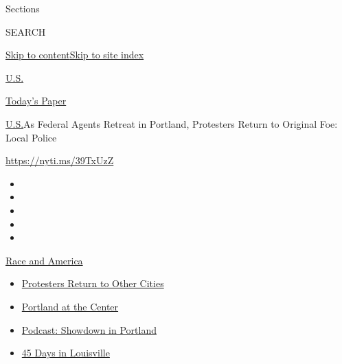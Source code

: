 Sections

SEARCH

\protect\hyperlink{site-content}{Skip to
content}\protect\hyperlink{site-index}{Skip to site index}

\href{https://www.nytimes.com/section/us}{U.S.}

\href{https://myaccount.nytimes.com/auth/login?response_type=cookie\&client_id=vi}{}

\href{https://www.nytimes.com/section/todayspaper}{Today's Paper}

\href{/section/us}{U.S.}\textbar{}As Federal Agents Retreat in Portland,
Protesters Return to Original Foe: Local Police

\url{https://nyti.ms/39TxUzZ}

\begin{itemize}
\item
\item
\item
\item
\item
\end{itemize}

\href{https://www.nytimes.com/news-event/george-floyd-protests-minneapolis-new-york-los-angeles?action=click\&pgtype=Article\&state=default\&region=TOP_BANNER\&context=storylines_menu}{Race
and America}

\begin{itemize}
\tightlist
\item
  \href{https://www.nytimes.com/2020/07/26/us/protests-portland-seattle-trump.html?action=click\&pgtype=Article\&state=default\&region=TOP_BANNER\&context=storylines_menu}{Protesters
  Return to Other Cities}
\item
  \href{https://www.nytimes.com/2020/07/24/us/portland-oregon-protests-white-race.html?action=click\&pgtype=Article\&state=default\&region=TOP_BANNER\&context=storylines_menu}{Portland
  at the Center}
\item
  \href{https://www.nytimes.com/2020/07/23/podcasts/the-daily/portland-protests.html?action=click\&pgtype=Article\&state=default\&region=TOP_BANNER\&context=storylines_menu}{Podcast:
  Showdown in Portland}
\item
  \href{https://www.nytimes.com/interactive/2020/07/16/us/black-lives-matter-protests-louisville-breonna-taylor.html?action=click\&pgtype=Article\&state=default\&region=TOP_BANNER\&context=storylines_menu}{45
  Days in Louisville}
\end{itemize}

